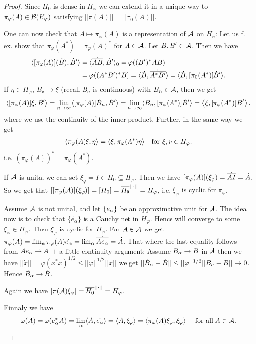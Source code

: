 \documentclass[10pt,english,a4paper]{article}
\theoremstyle{definition}
\def\dA{\dot{A}}
\def\dB{\dot{B}}
\def\eal{e_{\alpha}}
\def\dA{\dot{A}}
\def\dB{\dot{B}}
\def\vphi{\varphi}
\begin{document}
\begin{proof}
Since $H_0$
is dense in $H_{\vphi}$ we can extend it in a unique way to $\pi_{\vphi}(A) \in \Bs(H_{\vphi})$
satisfying $||\pi(A)|| = ||\pi_0(A)||$.

One can now check that $A \mapsto \pi_{\vphi} (A)$ is a representation of $\mathcal{A}$
on $H_{\vphi}$:
Let us f. ex. show that $\pi_{\vphi}(A^*) = \pi_{\vphi}(A)^*$ for $A \in \mathcal{A}$.
Let $B,B' \in \mathcal{A}$. Then we have 
\begin{align*}
    \indi{[\pi_{\vphi}(A)](\dB), \dB'} &= \indi{\dot{\ol{AB}},\dB'}_0 =
\vphi((B')^*AB) \\
&= \vphi((A^*B')^*B) = \indi{\dB, \dot{\ol{A^*B'}}} = \indi{\dB, [\pi_0(A^*)]\dB'}.
\end{align*}
If $\eta \in H_{\vphi}$, $\dB_n \to \xi$ (recall $\dB_n$ is continuous) with $B_n \in \mathcal{A}$,
then we get 
\begin{align*}
    \indi{[\pi_{\vphi}(A)]\xi,\dB'} = \lim_{n\to\infty} \indi{[\pi_{\vphi}(A)]\dB_n, \dB'}
= \lim_{n\to\infty} \indi{\dB_n, [\pi_{\vphi}(A^*)]\dB'} = \ind{\xi,[\pi_{\vphi}(A^*)]\dB'}.
\end{align*}
where we use the continuity of the inner-product. Further, in the same way we get
\begin{align*}
    \indi{\pi_{\vphi}(A)\xi,\eta} = \indi{\xi, \pi_{\vphi}(A^*)\eta} \quad \text{for }
\xi,\eta\in H_{\vphi}.
\end{align*}
i.e. \ul{$(\pi_{\vphi}(A))^* = \pi_{\vphi}(A^*)$}.

If $\mathcal{A}$ is unital we can set $\xi_{\vphi} = \dot{I} \in H_0 \subseteq
H_{\vphi}$.  Then we have $[\pi_{\vphi}(A)](\xi_{\vphi}) = \dot{\ol{AI}} =
\dA$.  So we get that $\left[[\pi_{\vphi}(\As)](\xi_{\vphi})\right]  = [H_0] =
\ol{H_0}^{||\cdot||} = H_{\vphi}$, i.e. \ul{$\xi_{\vphi}$ is cyclic for
$\pi_{\vphi}$}.

Assume $\mathcal{A}$ is not unital, and let $\{e_{\alpha}\}$ be an approximative unit for $\mathcal{A}$.
The idea now is to check that $\{\dot{\eal}\}$ is a Cauchy net in $H_{\vphi}$.
Hence will converge to some $\xi_{\vphi} \in H_{\vphi}$. Then $\xi_{\vphi}$ is cyclic 
for $H_{\vphi}$.
For $A \in \mathcal{A}$ we get $\pi_{\vphi}(A) = \lim_{\al} \pi_{\vphi}(A)\dot{\eal} = 
\lim_{\al} \dot{\ol{Ae_{\al}}} = \dA$.
That where the last equality follows from $Ae_{\alpha}\to A$ $+$ a little
continuity argument: Assume $B_{\alpha}\to B$ in $\mathcal{A}$ then we have 
$||\dot{x}|| = \vphi(x^*x)^{1/2} \leq ||\vphi||^{1/2}||x||$ we get 
$||\dB_{\al} - \dB|| \leq ||\vphi||^{1/2} ||B_{\al} - B|| \to 0$. Hence 
$\dB_{\al}\to \dB$.

Again we have $[\pi(\As)\xi_{\vphi}] = \ol{H_0}^{||\cdot||} = H_{\vphi}$.

Finnaly we have
\begin{align*}
    \vphi(A) = \vphi(e^{*}_{\al}A) = \lim_{\al} \indi{\dA,\dot{\eal}} = \indi{\dA, \xi_{\vphi}}
= \indi{\pi_{\vphi}(A)\xi_{\vphi},\xi_{\vphi}} \quad\text{ for all }A \in \As.
\end{align*}

\end{proof}
\end{document}
